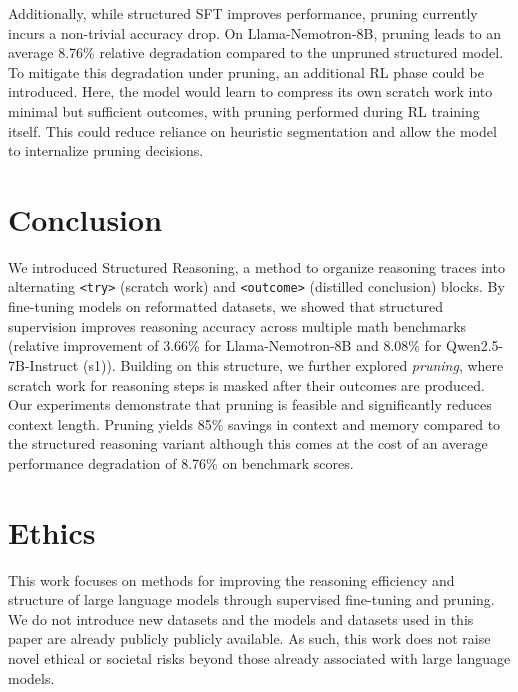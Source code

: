 \documentclass{article}
\begin{document}
Additionally, while structured SFT improves performance, pruning currently incurs a non-trivial accuracy drop. On Llama-Nemotron-8B, pruning leads to an average 8.76\% relative degradation compared to the unpruned structured model. To mitigate this degradation under pruning, an additional RL phase could be introduced. Here, the model would learn to compress its own scratch work into minimal but sufficient outcomes, with pruning performed during RL training itself. This could reduce reliance on heuristic segmentation and allow the model to internalize pruning decisions.  

\section{Conclusion}
We introduced Structured Reasoning, a method to organize reasoning traces into alternating \texttt{<try>} (scratch work) and \texttt{<outcome>} (distilled conclusion) blocks. By fine-tuning models on reformatted datasets, we showed that structured supervision improves reasoning accuracy across multiple math benchmarks (relative improvement of 3.66\% for Llama-Nemotron-8B and 8.08\% for Qwen2.5-7B-Instruct (s1)). Building on this structure, we further explored \emph{pruning}, where scratch work for reasoning steps is masked after their outcomes are produced. Our experiments demonstrate that pruning is feasible and significantly reduces context length. Pruning yields 85\% savings in context and memory compared to the structured reasoning variant although this comes at the cost of an average performance degradation of 8.76\% on benchmark scores. 


\section{Ethics}
This work focuses on methods for improving the reasoning efficiency and structure of large language models through supervised fine-tuning and pruning. We do not introduce new datasets and the models and datasets used in this paper are already publicly publicly available. As such, this work does not raise novel ethical or societal risks beyond those already associated with large language models.
\end{document}
